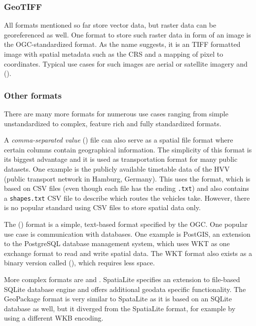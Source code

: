 		\subsubsection{GeoTIFF}
		
			All formats mentioned so far store vector data, but raster data can be georeferenced as well.
			One format to store such raster data in form of an image is the OGC-standardized  format\cite{ogc-geotiff}.
			As the name suggests, it is an TIFF formatted image with spatial metadata such as the CRS and a mapping of pixel to coordinates.
			Typical use cases for such images are aerial or satellite imagery and  ().
		
		\subsubsection{Other formats}
		
			There are many more formats for numerous use cases ranging from simple unstandardized to complex, feature rich and fully standardized formats.
			
			A \emph{comma-separated value} () file can also serve as a spatial file format where certain columns contain geographical information.
			The simplicity of this format is its biggest advantage and it is used as transportation format for many public datasets.
			One example is the publicly available timetable data of the HVV (public transport network in Hamburg, Germany)\cite{hvv-fahrplandaten}.
			This uses the  format, which is based on CSV files (even though each file has the ending \texttt{.txt}) and also contains a \texttt{shapes.txt} CSV file to describe which routes the vehicles take\cite{google-gtfs}.
			However, there is no popular standard using CSV files to store spatial data only.
			
			The  () format is a simple, text-based format specified by the OGC\cite[51]{ogc-sfa}.
			One popular use case is communication with databases.
			One example is PostGIS, an extension to the PostgreSQL database management system, which uses WKT as one exchange format to read and write spatial data\cite{postgis-doc-wkt}.
			The WKT format also exists as a binary version called  (), which requires less space.
			
			More complex formats are  and .
			SpatiaLite specifies an extension to file-based SQLite database engine and offers additional geodata specific functionality\cite{spatialite-website}.
			The GeoPackage format is very similar to SpataLite as it is based on an SQLite database as well, but it diverged from the SpatiaLite format, for example by using a different WKB encoding\cite{geopackage-faq}.
			
